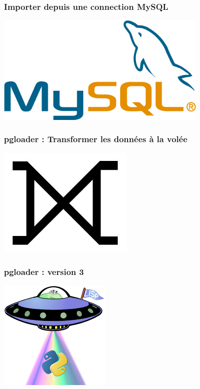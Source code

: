 \documentclass{beamer}
\begin{document}
\begin{frame}
  \frametitle{Importer depuis une connection MySQL}


  \begin{center}
    \includegraphics[height=2.1in]{mysql.png}
  \end{center}
\end{frame}

\begin{frame}
  \frametitle{pgloader : Transformer les données à la volée}


  \begin{center}
    \includegraphics[height=2.1in]{huge-full-outer-join.jpg}
  \end{center}
\end{frame}

\begin{frame}
  \frametitle{pgloader : version 3}

  \begin{center}
    \includegraphics[height=2.1in]{lisp-python.png}
  \end{center}

\end{frame}
\end{document}
